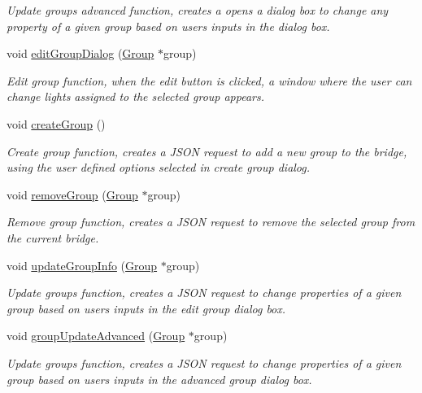 \begin{DoxyCompactItemize}
\begin{DoxyCompactList}\small\item\em Update groups advanced function, creates a opens a dialog box to change any property of a given group based on user\textquotesingle{}s inputs in the dialog box. \end{DoxyCompactList}\item 
void \hyperlink{classLightManagementWidget_a78e5bc6b0f7f5fbe2fe4bf26f61667a7}{edit\+Group\+Dialog} (\hyperlink{classGroup}{Group} $\ast$group)
\begin{DoxyCompactList}\small\item\em Edit group function, when the edit button is clicked, a window where the user can change lights assigned to the selected group appears. \end{DoxyCompactList}\item 
void \hyperlink{classLightManagementWidget_a0471c906b78aadede7142dc0cfa163aa}{create\+Group} ()
\begin{DoxyCompactList}\small\item\em Create group function, creates a J\+S\+ON request to add a new group to the bridge, using the user defined options selected in create group dialog. \end{DoxyCompactList}\item 
void \hyperlink{classLightManagementWidget_aa05013c523ad75a8e5cf76f1698ce33e}{remove\+Group} (\hyperlink{classGroup}{Group} $\ast$group)
\begin{DoxyCompactList}\small\item\em Remove group function, creates a J\+S\+ON request to remove the selected group from the current bridge. \end{DoxyCompactList}\item 
void \hyperlink{classLightManagementWidget_aa121e339ea3b4b7df1d2c60fffc01cd2}{update\+Group\+Info} (\hyperlink{classGroup}{Group} $\ast$group)
\begin{DoxyCompactList}\small\item\em Update groups function, creates a J\+S\+ON request to change properties of a given group based on user\textquotesingle{}s inputs in the edit group dialog box. \end{DoxyCompactList}\item 
void \hyperlink{classLightManagementWidget_a4515cfa200080a28655aa73f43641cf5}{group\+Update\+Advanced} (\hyperlink{classGroup}{Group} $\ast$group)
\begin{DoxyCompactList}\small\item\em Update groups function, creates a J\+S\+ON request to change properties of a given group based on user\textquotesingle{}s inputs in the advanced group dialog box. \end{DoxyCompactList}\item 

\end{DoxyCompactItemize}
